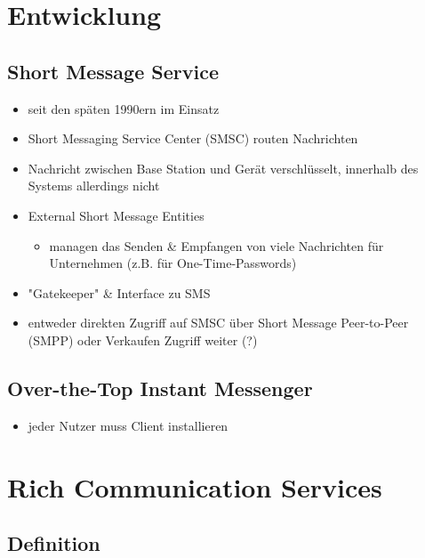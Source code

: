 \documentclass[conference]{IEEEtran}
\begin{document}
\section{Entwicklung}

\subsection{Short Message Service}

\begin{itemize}
    \item seit den späten 1990ern im Einsatz
    \item Short Messaging Service Center (SMSC) routen Nachrichten
    \item Nachricht zwischen Base Station und Gerät verschlüsselt, innerhalb des Systems allerdings nicht
    \item External Short Message Entities
          \begin{itemize}
              \item managen das Senden \& Empfangen von viele Nachrichten für Unternehmen (z.B. für One-Time-Passwords)
          \end{itemize}
    \item "Gatekeeper" \& Interface zu SMS
    \item entweder direkten Zugriff auf SMSC über Short Message Peer-to-Peer (SMPP) oder Verkaufen Zugriff weiter (?)
\end{itemize}
\cite{sendoutsms}

\subsection{Over-the-Top Instant Messenger}

\begin{itemize}
    \item jeder Nutzer muss Client installieren
\end{itemize}
\cite{rcsmno}

\section{Rich Communication Services}

\subsection{Definition}
\end{document}
